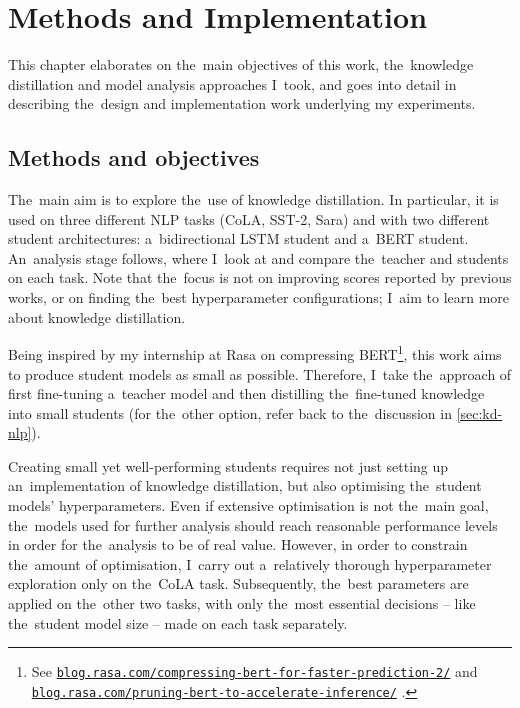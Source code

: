 \documentclass[bsc,frontabs,singlespacing,parskip,deptreport]{infthesis}
\newcommand\rurl[1]{%
  \href{https://#1}{\nolinkurl{#1}}%
}
\begin{document}
\chapter{Methods and Implementation}{
  \label{chap:methods-implementation}

  This chapter elaborates on the~main objectives of this work, the~knowledge distillation and model analysis approaches I~took, and goes into detail in describing the~design and implementation work underlying my experiments.

  \section{Methods and objectives}{
    \label{sec:methods}
    The~main aim is to explore the~use of knowledge distillation. In particular, it is used on three different NLP tasks (CoLA, SST-2, Sara) and with two different student architectures: a~bidirectional LSTM student and a~BERT student. An~analysis stage follows, where I~look at and compare the~teacher and students on each task. 
    Note that the~focus is not on improving scores reported by previous works, or on finding the~best hyperparameter configurations; I~aim to learn more about knowledge distillation.

    Being inspired by my internship at Rasa on compressing BERT\footnote{See \rurl{blog.rasa.com/compressing-bert-for-faster-prediction-2/} and \rurl{blog.rasa.com/pruning-bert-to-accelerate-inference/}.}, this work aims to produce student models as small as possible.
    Therefore, I~take the~approach of first fine-tuning a~teacher model and then distilling the~fine-tuned knowledge into small students (for the~other option, refer back to the~discussion in \autoref{sec:kd-nlp}).

    Creating small yet well-performing students requires not just setting up an~implementation of knowledge distillation, but also optimising the~student models' hyperparameters.
    Even if extensive optimisation is not the~main goal, the~models used for further analysis should reach reasonable performance levels in order for the~analysis to be of real value.
    However, in order to constrain the~amount of optimisation, I~carry out a~relatively thorough hyperparameter exploration only on the~CoLA task. 
    Subsequently, the~best parameters are applied on the~other two tasks, with only the~most essential decisions -- like the~student model size -- made on each task separately.

}}
\end{document}

